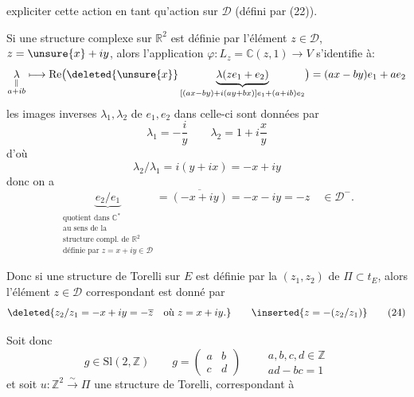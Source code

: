 expliciter cette action en tant qu'action sur $\mathcal D$ (défini par (22)).

Si une structure complexe sur $\mathbb R^2$ est définie par l'élément $z\in\mathcal D$, $z=\unsure{x}+iy$, alors l'application  $\varphi:L_z=\mathbb C(z,1)\longrightarrow V$ s'identifie à:
\[
\underset{\substack{\Vert\\a+ib}}{\lambda}\longmapsto
\operatorname{Re}\bigl(\deleted{\unsure{x}}\underbrace{\lambda(ze_1+e_2)}_{[(ax-by)+i(ay+bx)]e_1+(a+ib)e_2}\bigr)
=(ax-by)e_1+ae_2
\]
les images inverses $\lambda_1,\lambda_2$ de $e_1,e_2$ dans celle-ci sont données par
\[
\lambda_1=-\frac{i}{y}\qquad
\lambda_2=1+i\frac{x}{y}
\]
d'où
\[
\lambda_2/\lambda_1=i(y+ix)=-x+iy
\]
donc on a
\[
\underbrace{e_2/e_1}_{\substack{\text{quotient dans }\mathbb C^*\\
\text{au sens de la}\\
\text{structure compl. de }\mathbb R^2\\
\text{définie par }z=x+iy\in\mathcal D}}
=\overline{(-x+iy)}=-x-iy=-z
\quad\in\mathcal D^-.
\]

Donc si une structure de Torelli sur $E$ est définie par la  $(z_1,z_2)$ de $\Pi\subset t_E$, alors l'élément $z\in\mathcal D$ correspondant est donné par
\begin{equation}
\deleted{z_2/z_1=-x+iy=-\overline z\quad\text{où }z=x+iy.}
\qquad\inserted{z=-(z_2/z_1)}
\tag{24}
\end{equation}

Soit donc
\[
g\in\mathrm{Sl}(2,\mathbb Z)\qquad
g=\begin{pmatrix}a&b\\c&d\end{pmatrix}
\qquad
\begin{gathered}
a,b,c,d\in\mathbb Z\\
ad-bc=1
\end{gathered}
\]
et soit  $u:\mathbb Z^2\xrightarrow{\sim}\Pi$ une structure de Torelli, correspondant à

